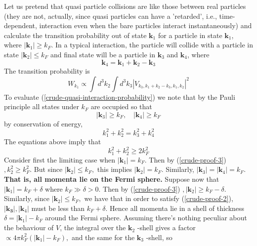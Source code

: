 Let us pretend that quasi particle collisions are like those between real particles (they are not, actually, since quasi particles can have a 'retarded', i.e., time-dependent, interaction even when the bare particles interact instantaneously) and calculate the transition probability out of state $\mathbf{k}_1$ for a particle in state $\mathbf{k}_1$, where $|\mathbf{k}_1|\geq k_F$. In a typical interaction, the particle will collide with a particle in state $|\mathbf{k}_2|\leq k_F$ and final state will be a particle in $\mathbf{k}_3$ and $\mathbf{k}_4$, where
\begin{equation}\mathbf{k}_{4}=\mathbf{k}_{1}+\mathbf{k}_{2}-\mathbf{k}_{3}\end{equation}
The transition probability is
\begin{equation}W_{k_{1}} \propto \int d^{3} k_{2} \int d^{3} k_{3}\left|V_{k_{3}, k_{1}+k_{2}-k_{3}, k_{1}, k_{2}}\right|^{2}
\label{crude-quasi-interaction-probability}
\end{equation}
To evaluate (\ref{crude-quasi-interaction-probability}) we note that by the Pauli principle all states under $k_F$ are occupied so that \begin{equation}\left|\mathbf{k}_{3}\right| \geqslant k_{F}, \quad\left|\mathbf{k}_{4}\right| \geqslant k_{F}
\label{crude-proof-1}
\end{equation}
by conservation of energy,
\begin{equation}k_{1}^{2}+k_{2}^{2}=k_{3}^{2}+k_{4}^{2}
\label{crude-proof-2}
\end{equation}
The equations above imply that 
\begin{equation}k_{1}^{2}+k_{2}^{2} \geqslant 2 k_{F}^{2}
\label{crude-proof-3}
\end{equation}
Consider first the limiting case when $\left|\mathbf{k}_{1}\right|=k_{F} .$ Then by (\ref{crude-proof-3})$, k_{2}^{2} \geqslant k_{F}^{2} .$ But since $\left|\mathbf{k}_{2}\right| \leqslant k_{F},$ this implies $\left|\mathbf{k}_{2}\right|=k_{F}$. Similarly, $\left|\mathbf{k}_{3}\right|=\left|\mathbf{k}_{4}\right|=k_{F} .$ \textbf{That is, all momenta lie on the Fermi sphere.} Suppose now that $\left|\mathbf{k}_{1}\right|=k_{F}+\delta$ where $k_{F} \gg \delta>0 .$ Then by (\ref{crude-proof-3}) $,\left|\mathbf{k}_{2}\right| \geqslant k_{F}-\delta .$ Similarly, since $\left|\mathbf{k}_{2}\right| \leqslant k_{F},$ we have that in order to satisfy (\ref{crude-proof-2}), $\left|\mathbf{k}_{\mathbf{3}}\right|,\left|\mathbf{k}_{4}\right|$ must be less than $k_{F}+\delta .$ Hence all momenta lie in a shell of thickness $\delta=\left|\mathbf{k}_{1}\right|-k_{F}$ around the Fermi sphere. Assuming there's nothing peculiar about the behaviour of $V$, the integral over the $\mathbf{k}_{2}$ -shell gives a factor $\propto 4 \pi k_{F}^{2}\left(\left|\mathbf{k}_{1}\right|-k_{F}\right),$ and the same for the $\mathbf{k}_{3}$ -shell, so
